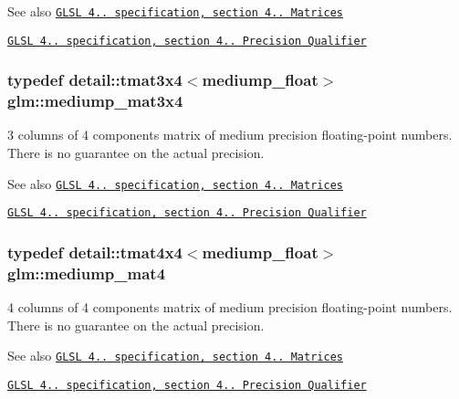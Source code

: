 \begin{DoxySeeAlso}{See also}
\href{http://www.opengl.org/registry/doc/GLSLangSpec.4.20.8.pdf}{\tt G\+L\+S\+L 4.. specification, section 4.. Matrices} 

\href{http://www.opengl.org/registry/doc/GLSLangSpec.4.20.8.pdf}{\tt G\+L\+S\+L 4.. specification, section 4.. Precision Qualifier} 
\end{DoxySeeAlso}
\hypertarget{group__core__precision_gaa530d8f06a8f1187cd1e0c2ce46cac42}{}
\subsubsection[{mediump\+\_\+mat3x4}]{\setlength{\rightskip}{0pt plus 5cm}typedef detail\+::tmat3x4$<$mediump\+\_\+float$>$ {\bf glm\+::mediump\+\_\+mat3x4}}\label{group__core__precision_gaa530d8f06a8f1187cd1e0c2ce46cac42}
3 columns of 4 components matrix of medium precision floating-\/point numbers. There is no guarantee on the actual precision.

\begin{DoxySeeAlso}{See also}
\href{http://www.opengl.org/registry/doc/GLSLangSpec.4.20.8.pdf}{\tt G\+L\+S\+L 4.. specification, section 4.. Matrices} 

\href{http://www.opengl.org/registry/doc/GLSLangSpec.4.20.8.pdf}{\tt G\+L\+S\+L 4.. specification, section 4.. Precision Qualifier} 
\end{DoxySeeAlso}
\hypertarget{group__core__precision_gabd9b3a319a914cd49dab821d4dbc93d4}{}
\subsubsection[{mediump\+\_\+mat4}]{\setlength{\rightskip}{0pt plus 5cm}typedef detail\+::tmat4x4$<$mediump\+\_\+float$>$ {\bf glm\+::mediump\+\_\+mat4}}\label{group__core__precision_gabd9b3a319a914cd49dab821d4dbc93d4}
4 columns of 4 components matrix of medium precision floating-\/point numbers. There is no guarantee on the actual precision.

\begin{DoxySeeAlso}{See also}
\href{http://www.opengl.org/registry/doc/GLSLangSpec.4.20.8.pdf}{\tt G\+L\+S\+L 4.. specification, section 4.. Matrices} 

\href{http://www.opengl.org/registry/doc/GLSLangSpec.4.20.8.pdf}{\tt G\+L\+S\+L 4.. specification, section 4.. Precision Qualifier} 
\end{DoxySeeAlso}
\hypertarget{group__core__precision_gad8c4b5a61db5087e32506b2022442edd}{}
